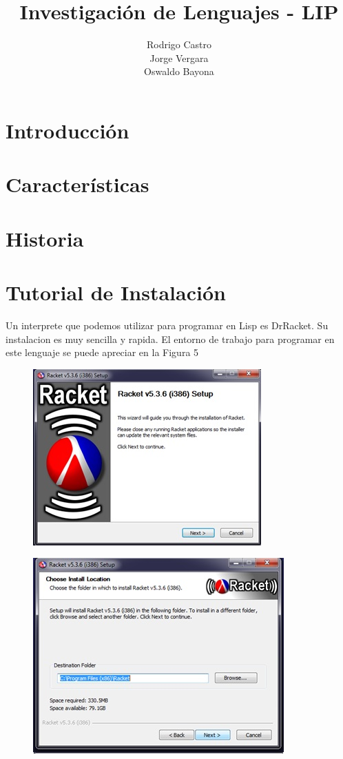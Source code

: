 \documentclass[11pt]{article} %
\title{Investigación de Lenguajes - LIP}
\author{Rodrigo Castro\\Jorge Vergara\\Oswaldo Bayona}
\begin{document}
\maketitle

\section{Introducción}

\section{Características}


\section{Historia}


\section{Tutorial de Instalación}
Un interprete que podemos utilizar para programar en Lisp es DrRacket. Su instalacion es muy sencilla y rapida.
El entorno de trabajo para programar en este lenguaje se puede apreciar en la Figura 5


\begin{figure}[h]
\centering
    \includegraphics{imagenes_investigacion/paso_uno.jpg}
\caption {}
\label{Figura 1}
\end{figure}

\begin{figure}[h]
\centering
    \includegraphics{imagenes_investigacion/paso_dos.jpg}
\caption { }
\label{Figura 2}
\end{figure}
\end{document}
